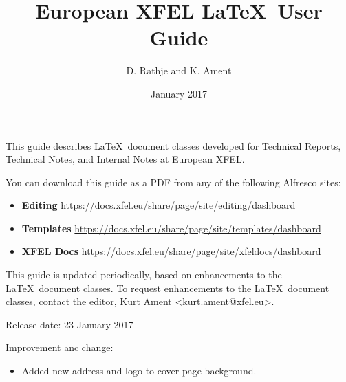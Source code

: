 \documentclass[]{xfel.eu-report}
\title{European XFEL \LaTeX\ User Guide}
\date{January 2017}
\author{D. Rathje and K. Ament}
\begin{document}
 


\newcommand{\command}[1] {{\tt #1}}


\newpage


This guide describes \LaTeX\ document classes developed for Technical
Reports, Technical Notes, and Internal Notes at European XFEL.

You can download this guide as a PDF from any of the following Alfresco sites:

\begin{itemize}
	\item {\bf Editing} 
	\linebreak
	\url{https://docs.xfel.eu/share/page/site/editing/dashboard}
	\linebreak
	\item {\bf Templates} 
	\linebreak
	\url{https://docs.xfel.eu/share/page/site/templates/dashboard}
	\linebreak
	\item {\bf XFEL Docs} 
	\linebreak
	\url{https://docs.xfel.eu/share/page/site/xfeldocs/dashboard}
\end{itemize} 



This guide is updated periodically, based on enhancements to the \LaTeX\ document classes. 
To request enhancements to the \LaTeX\ document classes, contact the editor, 
Kurt Ament <\href{mailto:kurt.ament@xfel.eu}{kurt.ament@xfel.eu}>.


Release date: 23 January 2017

Improvement anc change: 

\begin{itemize}
	\item Added new address and logo to cover page background. 
\end{itemize} 
\end{document}
